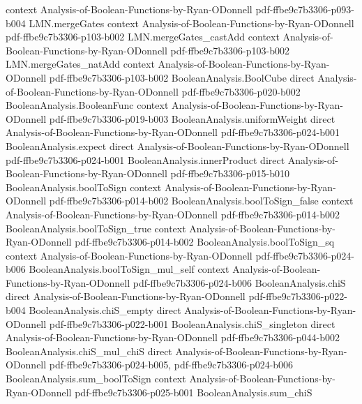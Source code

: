 \begin{lemma}
  {context}
  {Analysis-of-Boolean-Functions-by-Ryan-ODonnell}
  {pdf-ffbe9c7b3306-p093-b004}
\proofstep
  {LMN.mergeGates}
  {context}
  {Analysis-of-Boolean-Functions-by-Ryan-ODonnell}
  {pdf-ffbe9c7b3306-p103-b002}
\proofstep
  {LMN.mergeGates_castAdd}
  {context}
  {Analysis-of-Boolean-Functions-by-Ryan-ODonnell}
  {pdf-ffbe9c7b3306-p103-b002}
\proofstep
  {LMN.mergeGates_natAdd}
  {context}
  {Analysis-of-Boolean-Functions-by-Ryan-ODonnell}
  {pdf-ffbe9c7b3306-p103-b002}
\proofstep
  {BooleanAnalysis.BoolCube}
  {direct}
  {Analysis-of-Boolean-Functions-by-Ryan-ODonnell}
  {pdf-ffbe9c7b3306-p020-b002}
\proofstep
  {BooleanAnalysis.BooleanFunc}
  {context}
  {Analysis-of-Boolean-Functions-by-Ryan-ODonnell}
  {pdf-ffbe9c7b3306-p019-b003}
\proofstep
  {BooleanAnalysis.uniformWeight}
  {direct}
  {Analysis-of-Boolean-Functions-by-Ryan-ODonnell}
  {pdf-ffbe9c7b3306-p024-b001}
\proofstep
  {BooleanAnalysis.expect}
  {direct}
  {Analysis-of-Boolean-Functions-by-Ryan-ODonnell}
  {pdf-ffbe9c7b3306-p024-b001}
\proofstep
  {BooleanAnalysis.innerProduct}
  {direct}
  {Analysis-of-Boolean-Functions-by-Ryan-ODonnell}
  {pdf-ffbe9c7b3306-p015-b010}
\proofstep
  {BooleanAnalysis.boolToSign}
  {context}
  {Analysis-of-Boolean-Functions-by-Ryan-ODonnell}
  {pdf-ffbe9c7b3306-p014-b002}
\proofstep
  {BooleanAnalysis.boolToSign_false}
  {context}
  {Analysis-of-Boolean-Functions-by-Ryan-ODonnell}
  {pdf-ffbe9c7b3306-p014-b002}
\proofstep
  {BooleanAnalysis.boolToSign_true}
  {context}
  {Analysis-of-Boolean-Functions-by-Ryan-ODonnell}
  {pdf-ffbe9c7b3306-p014-b002}
\proofstep
  {BooleanAnalysis.boolToSign_sq}
  {context}
  {Analysis-of-Boolean-Functions-by-Ryan-ODonnell}
  {pdf-ffbe9c7b3306-p024-b006}
\proofstep
  {BooleanAnalysis.boolToSign_mul_self}
  {context}
  {Analysis-of-Boolean-Functions-by-Ryan-ODonnell}
  {pdf-ffbe9c7b3306-p024-b006}
\proofstep
  {BooleanAnalysis.chiS}
  {direct}
  {Analysis-of-Boolean-Functions-by-Ryan-ODonnell}
  {pdf-ffbe9c7b3306-p022-b004}
\proofstep
  {BooleanAnalysis.chiS_empty}
  {direct}
  {Analysis-of-Boolean-Functions-by-Ryan-ODonnell}
  {pdf-ffbe9c7b3306-p022-b001}
\proofstep
  {BooleanAnalysis.chiS_singleton}
  {direct}
  {Analysis-of-Boolean-Functions-by-Ryan-ODonnell}
  {pdf-ffbe9c7b3306-p044-b002}
\proofstep
  {BooleanAnalysis.chiS_mul_chiS}
  {direct}
  {Analysis-of-Boolean-Functions-by-Ryan-ODonnell}
  {pdf-ffbe9c7b3306-p024-b005,
    pdf-ffbe9c7b3306-p024-b006}
\proofstep
  {BooleanAnalysis.sum_boolToSign}
  {context}
  {Analysis-of-Boolean-Functions-by-Ryan-ODonnell}
  {pdf-ffbe9c7b3306-p025-b001}
\proofstep
  {BooleanAnalysis.sum_chiS}

\end{lemma}
